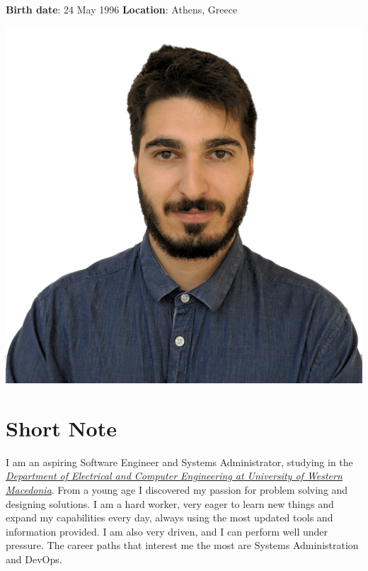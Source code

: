 \documentclass{mycv}
\begin{document}
	\pagestyle{empty}
	\begin{minipage}{0.69\textwidth}
		\begin{flushleft}
			\centering
			{\bf Birth date}: 24 May 1996 {\Large\textperiodcentered} {\bf Location}: Athens, Greece
		\end{flushleft}
	\end{minipage}
	\begin{minipage}{0.3\textwidth}
		\begin{flushright}
			\includegraphics[scale=0.05]{assets/christos.png}
		\end{flushright}
	\end{minipage}
	\vspace*{-0.5cm}
	\section{Short Note}
	\textnormal I am an aspiring Software Engineer and Systems Administrator, studying in the \href{https://ece.uowm.gr/?lan=en}{\textit{Department of Electrical and Computer Engineering at University of Western Macedonia}}. From a young age I discovered my passion for problem solving and designing solutions. I am a hard worker, very eager to learn new things and expand my capabilities every day, always using the most updated tools and information provided. I am also very driven, and I can perform well under pressure. The career paths that interest me the most are Systems Administration and DevOps.
\end{document}

